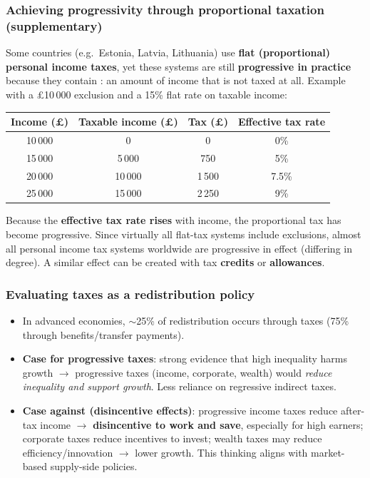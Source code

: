 \subsubsection*{Achieving progressivity through proportional taxation (supplementary)}
Some countries (e.g.\ Estonia, Latvia, Lithuania) use \textbf{flat (proportional) personal income taxes}, yet these systems are still \textbf{progressive in practice} because they contain : an amount of income that is not taxed at all. Example with a \pounds10\,000 exclusion and a 15\% flat rate on taxable income:
\begin{center}
\begin{tabular}{cccc}
\toprule
\textbf{Income (\pounds)} & \textbf{Taxable income (\pounds)} & \textbf{Tax (\pounds)} & \textbf{Effective tax rate} \\
\midrule
10\,000 & 0 & 0 & 0\% \\
15\,000 & 5\,000 & 750 & 5\% \\
20\,000 & 10\,000 & 1\,500 & 7.5\% \\
25\,000 & 15\,000 & 2\,250 & 9\% \\
\bottomrule
\end{tabular}
\end{center}
Because the \textbf{effective tax rate rises} with income, the proportional tax has become progressive. Since virtually all flat-tax systems include exclusions, almost all personal income tax systems worldwide are progressive in effect (differing in degree). A similar effect can be created with tax \textbf{credits} or \textbf{allowances}.

\subsubsection*{Evaluating taxes as a redistribution policy}
\begin{itemize}
  \item In advanced economies, $\sim$25\% of redistribution occurs through taxes (75\% through benefits/transfer payments).
  \item \textbf{Case for progressive taxes}: strong evidence that high inequality harms growth $\to$ progressive taxes (income, corporate, wealth) would \textit{reduce inequality and support growth}. Less reliance on regressive indirect taxes.
  \item \textbf{Case against (disincentive effects)}: progressive income taxes reduce after-tax income $\to$ \textbf{disincentive to work and save}, especially for high earners; corporate taxes reduce incentives to invest; wealth taxes may reduce efficiency/innovation $\to$ lower growth. This thinking aligns with market-based supply-side policies.
\end{itemize}
